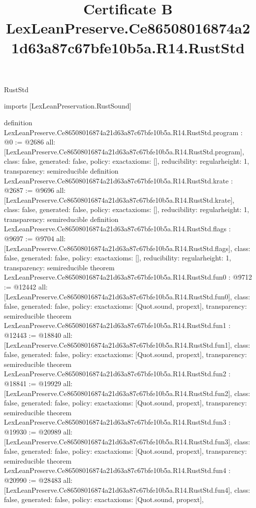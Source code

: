 \begin{lexlean}{RustStd}
\title{Certificate B LexLeanPreserve.Ce86508016874a21d63a87c67bfe10b5a.R14.RustStd}
\begin{coremodule}
imports [LexLeanPreservation.RustSound]

definition LexLeanPreserve.Ce86508016874a21d63a87c67bfe10b5a.R14.RustStd.program : @0 := @2686 {
  all: [LexLeanPreserve.Ce86508016874a21d63a87c67bfe10b5a.R14.RustStd.program],
  class: false,
  generated: false,
  policy: exact{axioms: []},
  reducibility: regular{height: 1},
  transparency: semireducible
}
definition LexLeanPreserve.Ce86508016874a21d63a87c67bfe10b5a.R14.RustStd.krate : @2687 := @9696 {
  all: [LexLeanPreserve.Ce86508016874a21d63a87c67bfe10b5a.R14.RustStd.krate],
  class: false,
  generated: false,
  policy: exact{axioms: []},
  reducibility: regular{height: 1},
  transparency: semireducible
}
definition LexLeanPreserve.Ce86508016874a21d63a87c67bfe10b5a.R14.RustStd.flags : @9697 := @9704 {
  all: [LexLeanPreserve.Ce86508016874a21d63a87c67bfe10b5a.R14.RustStd.flags],
  class: false,
  generated: false,
  policy: exact{axioms: []},
  reducibility: regular{height: 1},
  transparency: semireducible
}
theorem LexLeanPreserve.Ce86508016874a21d63a87c67bfe10b5a.R14.RustStd.fun0 : @9712 := @12442 {
  all: [LexLeanPreserve.Ce86508016874a21d63a87c67bfe10b5a.R14.RustStd.fun0],
  class: false,
  generated: false,
  policy: exact{axioms: [Quot.sound, propext]},
  transparency: semireducible
}
theorem LexLeanPreserve.Ce86508016874a21d63a87c67bfe10b5a.R14.RustStd.fun1 : @12443 := @18840 {
  all: [LexLeanPreserve.Ce86508016874a21d63a87c67bfe10b5a.R14.RustStd.fun1],
  class: false,
  generated: false,
  policy: exact{axioms: [Quot.sound, propext]},
  transparency: semireducible
}
theorem LexLeanPreserve.Ce86508016874a21d63a87c67bfe10b5a.R14.RustStd.fun2 : @18841 := @19929 {
  all: [LexLeanPreserve.Ce86508016874a21d63a87c67bfe10b5a.R14.RustStd.fun2],
  class: false,
  generated: false,
  policy: exact{axioms: [Quot.sound, propext]},
  transparency: semireducible
}
theorem LexLeanPreserve.Ce86508016874a21d63a87c67bfe10b5a.R14.RustStd.fun3 : @19930 := @20989 {
  all: [LexLeanPreserve.Ce86508016874a21d63a87c67bfe10b5a.R14.RustStd.fun3],
  class: false,
  generated: false,
  policy: exact{axioms: [Quot.sound, propext]},
  transparency: semireducible
}
theorem LexLeanPreserve.Ce86508016874a21d63a87c67bfe10b5a.R14.RustStd.fun4 : @20990 := @28483 {
  all: [LexLeanPreserve.Ce86508016874a21d63a87c67bfe10b5a.R14.RustStd.fun4],
  class: false,
  generated: false,
  policy: exact{axioms: [Quot.sound, propext]},
}
\end{coremodule}
\end{lexlean}
